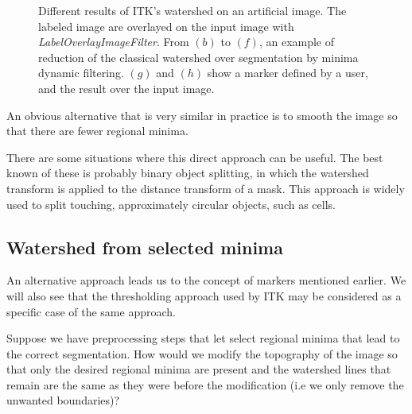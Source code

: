 \documentclass{InsightArticle}
\begin{document}
\begin{figure}[htbp]
\begin{center}
\caption{Different results of ITK's watershed on an artificial image. The labeled image are overlayed on the input image with {\em LabelOverlayImageFilter}. From $(b)$ to $(f)$, an example of reduction of the classical watershed over segmentation by minima dynamic filtering. $(g)$ and $(h)$ show a marker defined by a user, and the result over the input image.\label{fig:artificial-morpho}}
\end{center}
\end{figure}


An obvious alternative that is very similar in practice is to 
smooth the image so that there are fewer regional minima.

There are some situations where this direct approach can be
useful. The best known of these is probably binary object splitting,
in which the watershed transform is applied to the distance transform
of a mask. This approach is widely used to split touching,
approximately circular objects, such as cells.

\subsection{Watershed from selected minima}
\label{sect:ws-selected-minima}
An alternative approach leads us to the concept of markers mentioned
earlier. We will also see that the thresholding approach used by ITK
may be considered as a specific case of the same approach.

Suppose we have preprocessing steps that let select regional minima
that lead to the correct segmentation. How would we modify the
topography of the image so that only the desired regional minima are
present and the watershed lines that remain are the same as they were
before the modification (i.e we only remove the unwanted boundaries)?
\end{document}
